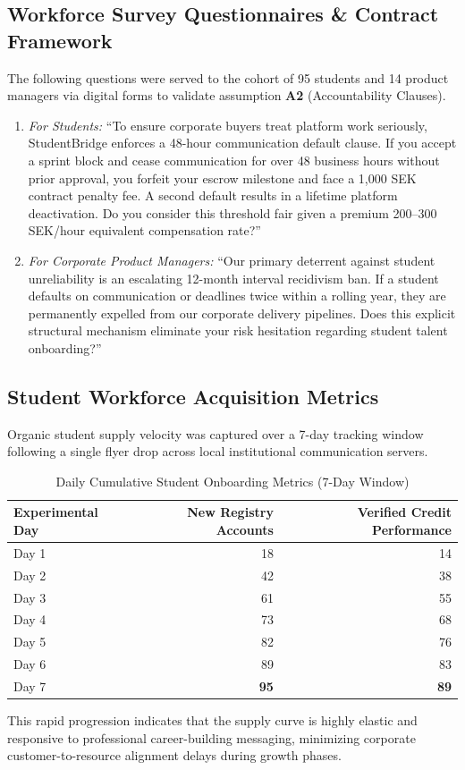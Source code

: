 \documentclass[12pt,a4paper]{article}
\begin{document}
\newpage
\subsection{Workforce Survey Questionnaires \& Contract Framework}
\label{app:surveys}

The following questions were served to the cohort of 95 students and 14 product managers via digital forms to validate assumption \textbf{A2} (Accountability Clauses).

\begin{enumerate}
    \item \emph{For Students:} ``To ensure corporate buyers treat platform work seriously, StudentBridge enforces a 48-hour communication default clause. If you accept a sprint block and cease communication for over 48 business hours without prior approval, you forfeit your escrow milestone and face a 1,000 SEK contract penalty fee. A second default results in a lifetime platform deactivation. Do you consider this threshold fair given a premium 200--300 SEK/hour equivalent compensation rate?''
    \item \emph{For Corporate Product Managers:} ``Our primary deterrent against student unreliability is an escalating 12-month interval recidivism ban. If a student defaults on communication or deadlines twice within a rolling year, they are permanently expelled from our corporate delivery pipelines. Does this explicit structural mechanism eliminate your risk hesitation regarding student talent onboarding?''
\end{enumerate}

\subsection{Student Workforce Acquisition Metrics}
\label{app:metrics}

Organic student supply velocity was captured over a 7-day tracking window following a single flyer drop across local institutional communication servers.

\begin{table}[ht]
\centering
\small
\caption{Daily Cumulative Student Onboarding Metrics (7-Day Window)}
\begin{tabularx}{0.8\textwidth}{Xrr}
\toprule
Experimental Day & New Registry Accounts & Verified Credit Performance \\
\midrule
Day 1 & 18 & 14 \\
Day 2 & 42 & 38 \\
Day 3 & 61 & 55 \\
Day 4 & 73 & 68 \\
Day 5 & 82 & 76 \\
Day 6 & 89 & 83 \\
Day 7 & \textbf{95} & \textbf{89} \\
\bottomrule
\end{tabularx}
\end{table}

This rapid progression indicates that the supply curve is highly elastic and responsive to professional career-building messaging, minimizing corporate customer-to-resource alignment delays during growth phases.
\end{document}
